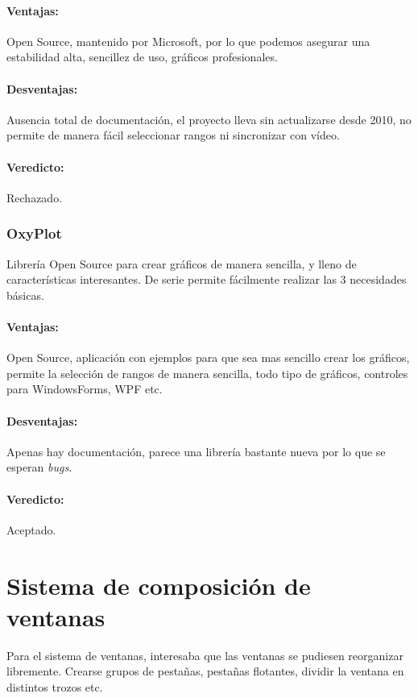 \paragraph{Ventajas:} Open Source, mantenido por Microsoft, por lo que podemos asegurar una estabilidad alta, sencillez de uso, gr\'{a}ficos profesionales.
\paragraph{Desventajas:} Ausencia total de documentaci\'{o}n, el proyecto lleva sin actualizarse desde 2010, no permite de manera f\'{a}cil seleccionar 
rangos ni sincronizar con v\'{i}deo.
\paragraph{Veredicto:} Rechazado.

\subsubsection{OxyPlot}
Librer\'{i}a Open Source para crear gr\'{a}ficos de manera sencilla, y lleno de caracter\'{i}sticas interesantes. De serie permite f\'{a}cilmente
realizar las 3 necesidades b\'{a}sicas.

\paragraph{Ventajas:} Open Source, aplicaci\'{o}n con ejemplos para que sea mas sencillo crear los gr\'{a}ficos, permite la selecci\'{o}n de rangos
de manera sencilla, todo tipo de gr\'{a}ficos, controles para WindowsForms, WPF etc.
\paragraph{Desventajas:} Apenas hay documentaci\'{o}n, parece una librer\'{i}a bastante nueva por lo que se esperan \emph{bugs}. 
\paragraph{Veredicto:} Aceptado.

\section{Sistema de composici\'{o}n de ventanas}
Para el sistema de ventanas, interesaba que las ventanas se pudiesen reorganizar libremente. Crearse grupos de pesta\~{n}as, pesta\~{n}as flotantes, 
dividir la ventana en distintos trozos etc.
